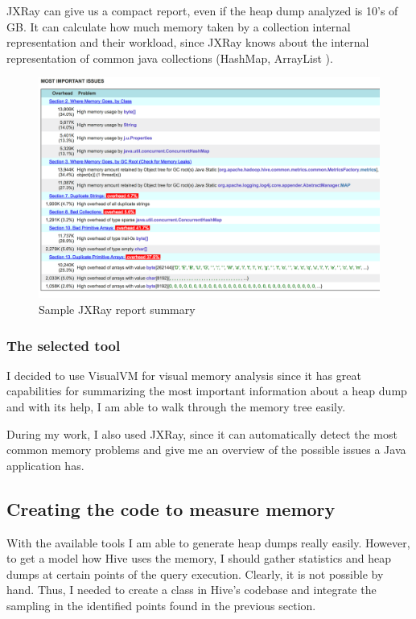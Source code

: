JXRay can give us a compact report, even if the heap dump analyzed is 10's of GB. It can calculate how much memory taken by a collection internal representation and their workload, since JXRay knows about the internal representation of common java collections (HashMap, ArrayList \etc).

\begin{figure}[H]
	\includegraphics[width=150mm, keepaspectratio]{figures/jxray_sample.png}
	\centering
	\caption{Sample JXRay report summary}
\end{figure}

\subsubsection{The selected tool}
I decided to use VisualVM for visual memory analysis since it has great capabilities for summarizing the most important information about a heap dump and with its help, I am able to walk through the memory tree easily.

During my work, I also used JXRay, since it can automatically detect the most common memory problems and give me an overview of the possible issues a Java application has.

\clearpage
\subsection{Creating the code to measure memory}
With the available tools I am able to generate heap dumps really easily. However, to get a model how Hive uses the memory, I should gather statistics and heap dumps at certain points of the query execution. Clearly, it is not possible by hand. Thus, I needed to create a class in Hive's codebase and integrate the sampling in the identified points found in the previous section.


